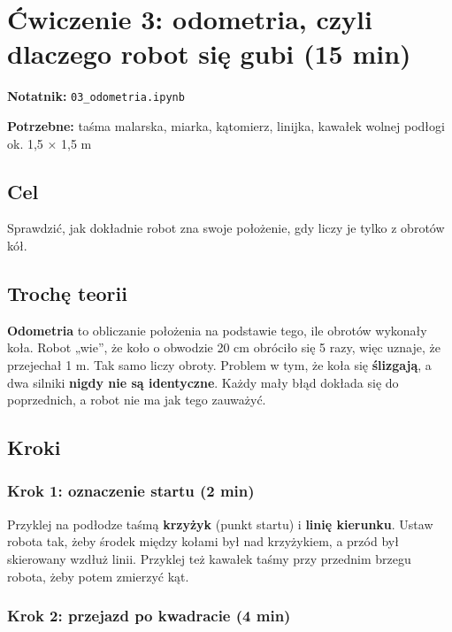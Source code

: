 \section{Ćwiczenie 3: odometria, czyli dlaczego robot się gubi (15 min)}\label{ux107wiczenie-3-odometria-czyli-dlaczego-robot-siux119-gubi-15-min}

\textbf{Notatnik:} \texttt{03\_odometria.ipynb}

\textbf{Potrzebne:} taśma malarska, miarka, kątomierz, linijka, kawałek wolnej podłogi ok. 1,5 × 1,5 m

\subsection{Cel}\label{cel}

Sprawdzić, jak dokładnie robot zna swoje położenie, gdy liczy je tylko z obrotów kół.

\subsection{Trochę teorii}\label{trochux119-teorii}

\textbf{Odometria} to obliczanie położenia na podstawie tego, ile obrotów wykonały koła. Robot „wie'', że koło o obwodzie 20 cm obróciło się 5 razy, więc uznaje, że przejechał 1 m. Tak samo liczy obroty. Problem w tym, że koła się \textbf{ślizgają}, a dwa silniki \textbf{nigdy nie są identyczne}. Każdy mały błąd dokłada się do poprzednich, a robot nie ma jak tego zauważyć.

\subsection{Kroki}\label{kroki}

\subsubsection{Krok 1: oznaczenie startu (2 min)}\label{krok-1-oznaczenie-startu-2-min}

Przyklej na podłodze taśmą \textbf{krzyżyk} (punkt startu) i \textbf{linię kierunku}. Ustaw robota tak, żeby środek między kołami był nad krzyżykiem, a przód był skierowany wzdłuż linii. Przyklej też kawałek taśmy przy przednim brzegu robota, żeby potem zmierzyć kąt.

\subsubsection{Krok 2: przejazd po kwadracie (4 min)}\label{krok-2-przejazd-po-kwadracie-4-min}


